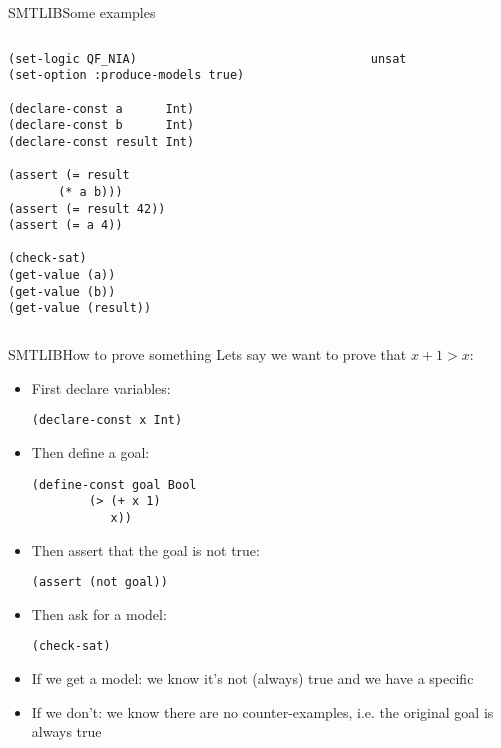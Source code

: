 \documentclass[aspectratio=169]{beamer}
\begin{document}
\begin{frame}[fragile]{SMTLIB}{Some examples}
  \begin{columns}
    \begin{column}{0.5\textwidth}
      \begin{lstlisting}[language=SMTLIB]
(set-logic QF_NIA)
(set-option :produce-models true)

(declare-const a      Int)
(declare-const b      Int)
(declare-const result Int)

(assert (= result
	   (* a b)))
(assert (= result 42))
(assert (= a 4))

(check-sat)
(get-value (a))
(get-value (b))
(get-value (result))
\end{lstlisting}
\end{column}
    \pause
    \begin{column}{0.5\textwidth}
      \begin{scriptsize}
\begin{verbatim}
unsat
\end{verbatim}
      \end{scriptsize}
    \end{column}
  \end{columns}
\end{frame}

\begin{frame}[fragile]{SMTLIB}{How to prove something}
  Lets say we want to prove that $x + 1 > x$:
  \begin{itemize}
  \item First declare variables:
    \begin{lstlisting}[language=SMTLIB,gobble=4]
      (declare-const x Int)
    \end{lstlisting}
    \pause
  \item Then define a goal:
    \begin{lstlisting}[language=SMTLIB,gobble=4]
      (define-const goal Bool
        (> (+ x 1)
           x))
    \end{lstlisting}
    \pause
  \item Then assert that the goal is not true:
    \begin{lstlisting}[language=SMTLIB,gobble=4]
      (assert (not goal))
    \end{lstlisting}
  \item Then ask for a model:
    \begin{lstlisting}[language=SMTLIB,gobble=4]
      (check-sat)
    \end{lstlisting}
    \pause
  \item If we get a model: we know it's not (always) true and we have
    a specific 
    \pause
  \item If we don't: we know there are no counter-examples, i.e. the
    original goal is always true
  \end{itemize}
\end{frame}
\end{document}
